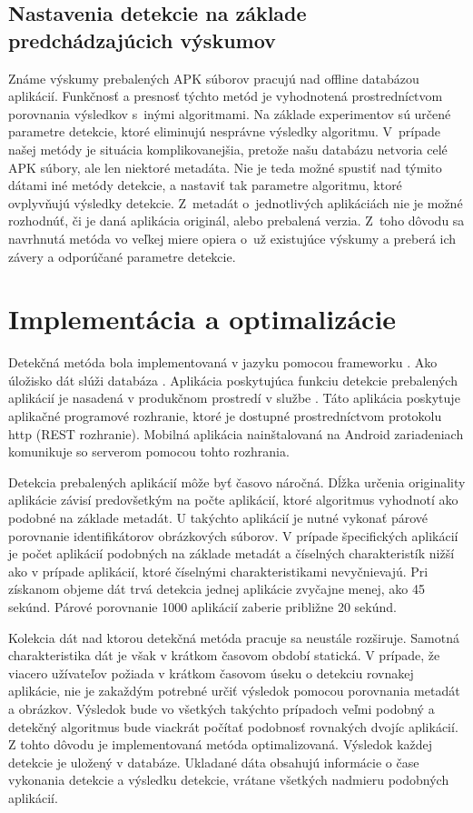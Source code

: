 \subsection*{Nastavenia detekcie na základe predchádzajúcich výskumov}
Známe výskumy prebalených APK súborov pracujú nad offline databázou aplikácií. Funkčnosť a presnosť týchto metód je vyhodnotená prostredníctvom porovnania výsledkov s~inými algoritmami. Na základe experimentov sú určené parametre detekcie, ktoré eliminujú nesprávne výsledky algoritmu. V~prípade našej metódy je situácia komplikovanejšia, pretože našu databázu netvoria celé APK súbory, ale len niektoré metadáta. Nie je teda možné spustiť nad týmito dátami iné metódy detekcie, a nastaviť tak parametre algoritmu, ktoré ovplyvňujú výsledky detekcie. Z~metadát o~jednotlivých aplikáciách nie je možné rozhodnúť, či je daná aplikácia originál, alebo prebalená verzia.  Z~toho dôvodu sa navrhnutá metóda vo veľkej miere opiera o~už existujúce výskumy a preberá ich závery a odporúčané parametre detekcie. 

\section{Implementácia a optimalizácie}
Detekčná metóda bola implementovaná v jazyku  pomocou frameworku . Ako úložisko dát slúži databáza . Aplikácia poskytujúca funkciu detekcie prebalených aplikácií je nasadená v produkčnom prostredí v službe . Táto aplikácia poskytuje aplikačné programové rozhranie, ktoré je dostupné prostredníctvom protokolu http (REST rozhranie). Mobilná aplikácia nainštalovaná na Android zariadeniach komunikuje so serverom pomocou tohto rozhrania. 

Detekcia prebalených aplikácií môže byť časovo náročná. Dĺžka určenia originality aplikácie závisí predovšetkým na počte aplikácií, ktoré algoritmus vyhodnotí ako podobné na základe metadát. U takýchto aplikácií je nutné vykonať párové porovnanie identifikátorov obrázkových súborov. V prípade špecifických aplikácií je počet aplikácií podobných na základe metadát a číselných charakteristík nižší ako v prípade aplikácií, ktoré číselnými charakteristikami nevyčnievajú. Pri získanom objeme dát trvá detekcia jednej aplikácie zvyčajne menej, ako 45 sekúnd. Párové porovnanie 1000 aplikácií zaberie približne 20 sekúnd. 

Kolekcia dát nad ktorou detekčná metóda pracuje sa neustále rozširuje. Samotná charakteristika dát je však v krátkom časovom období statická. V prípade, že viacero užívateľov požiada v krátkom časovom úseku o detekciu rovnakej aplikácie, nie je zakaždým potrebné určiť  výsledok pomocou porovnania metadát a obrázkov. Výsledok bude vo všetkých takýchto prípadoch veľmi podobný a detekčný algoritmus bude viackrát počítať podobnosť rovnakých dvojíc aplikácií. Z tohto dôvodu je implementovaná metóda optimalizovaná. Výsledok každej detekcie je uložený v databáze. Ukladané dáta obsahujú informácie o čase vykonania detekcie a výsledku detekcie, vrátane všetkých nadmieru podobných aplikácií. 

